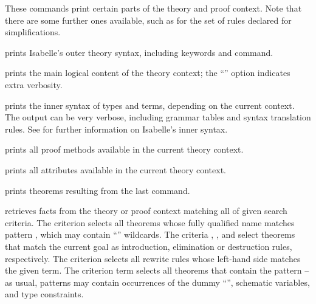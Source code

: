 \begin{isabellebody}
\begin{isamarkuptext}
  These commands print certain parts of the theory and proof context.
  Note that there are some further ones available, such as for the set
  of rules declared for simplifications.

  \begin{descr}
  
  \item [\mbox{\isa{\isacommand{print{\isacharunderscore}commands}}}] prints Isabelle's outer theory
  syntax, including keywords and command.
  
  \item [\mbox{\isa{\isacommand{print{\isacharunderscore}theory}}}] prints the main logical content of
  the theory context; the ``\isa{{\isacharbang}}'' option indicates extra
  verbosity.

  \item [\mbox{\isa{\isacommand{print{\isacharunderscore}syntax}}}] prints the inner syntax of types
  and terms, depending on the current context.  The output can be very
  verbose, including grammar tables and syntax translation rules.  See
  \cite[\S7, \S8]{isabelle-ref} for further information on Isabelle's
  inner syntax.
  
  \item [\mbox{\isa{\isacommand{print{\isacharunderscore}methods}}}] prints all proof methods
  available in the current theory context.
  
  \item [\mbox{\isa{\isacommand{print{\isacharunderscore}attributes}}}] prints all attributes
  available in the current theory context.
  
  \item [\mbox{\isa{\isacommand{print{\isacharunderscore}theorems}}}] prints theorems resulting from
  the last command.
  
  \item [\mbox{\isa{\isacommand{find{\isacharunderscore}theorems}}}~\isa{criteria}] retrieves facts
  from the theory or proof context matching all of given search
  criteria.  The criterion  selects all theorems
  whose fully qualified name matches pattern , which may
  contain ``\isa{{\isacharasterisk}}'' wildcards.  The criteria ,
  , and  select theorems that match the
  current goal as introduction, elimination or destruction rules,
  respectively.  The criterion  selects all rewrite
  rules whose left-hand side matches the given term.  The criterion
  term  selects all theorems that contain the pattern  -- as usual, patterns may contain occurrences of the dummy
  ``\isa{{\isacharunderscore}}'', schematic variables, and type constraints.
  

\end{descr}
\end{isamarkuptext}
\end{isabellebody}
